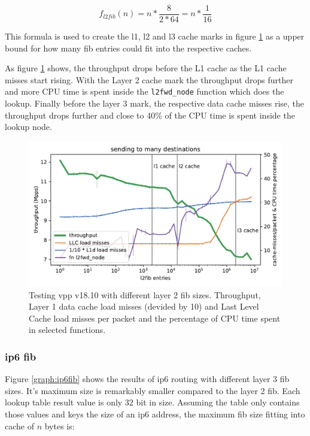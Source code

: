 $$ f_{l2fib}(n) = n * \frac{8}{2 * 64} = n * \frac{1}{16}  $$

This formula is used to create the l1, l2 and l3 cache marks in figure
\ref{graph:l2fib} as a upper bound for how many fib entries could fit
into the respective caches. 

As figure \ref{graph:l2fib} shows, the throughput drops before the L1
cache as the L1 cache misses start rising. With the Layer 2 cache mark
the throughput drops further and more CPU time is spent inside the
\lstinline|l2fwd_node| function which does the lookup. Finally before
the layer 3 mark, the respective data cache misses rise, the
throughput drops further and close to 40\% of the CPU time is spent
inside the lookup node.

\begin{figure}[!ht]
\noindent\hspace{0.5mm}\includegraphics[width=\linewidth]{pics/throughput_l2_throughmac_klaipeda32ghz_v2.pdf}
\caption{Testing \Ac{vpp} v18.10 with different layer 2 \Ac{fib} sizes. Throughput, Layer 1 data cache load misses (devided by 10) and Last Level Cache load misses per packet and the percentage of CPU time spent in selected functions. }
\label{graph:l2fib}
\end{figure}



\subsubsection{\Ac{ip6} \Ac{fib}}

Figure \ref{graph:ip6fib} shows the results of \Ac{ip6} routing with
different layer 3 \Ac{fib} sizes. It's maximum size is remarkably
smaller compared to the layer 2 \Ac{fib}. Each lookup table result
value is only 32 bit in size. Assuming the table only contains those
values and keys the size of an \Ac{ip6} address, the maximum \Ac{fib}
size fitting into cache of $n$ bytes is:

